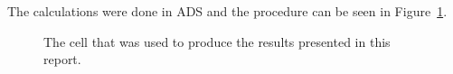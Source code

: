 \documentclass[12pt,a4paper]{article}
\begin{document}
The calculations were done in ADS and the procedure can be seen in Figure~\ref{fig:calcs}.
\begin{figure}
  \centering
  \noindent{}
  \caption{The cell that was used to produce the results presented in this report.}
  \label{fig:calcs}
\end{figure}
\end{document}
